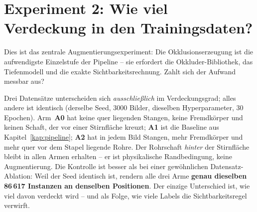 \section{Experiment 2: Wie viel Verdeckung in den Trainingsdaten?}
\label{sec:ablation}

Dies ist das zentrale Augmentierungsexperiment: Die Okklusionserzeugung ist die
aufwendigste Einzelstufe der Pipeline -- sie erfordert die Okkluder-Bibliothek,
das Tiefenmodell und die exakte Sichtbarkeitsrechnung. Zahlt sich der Aufwand
messbar aus?

 Drei Datensätze unterscheiden sich \emph{ausschließlich}
im Verdeckungsgrad; alles andere ist identisch (derselbe Seed, 3000 Bilder,
dieselben Hyperparameter, 30 Epochen). Arm~\textbf{A0} hat keine quer liegenden
Stangen, keine Fremdkörper und keinen Schaft, der vor einer Stirnfläche kreuzt;
\textbf{A1} ist die Baseline aus Kapitel~\ref{kap:pipeline}; \textbf{A2} hat in
jedem Bild Stangen, mehr Fremdkörper und mehr quer vor dem Stapel liegende Rohre.
Der Rohrschaft \emph{hinter} der Stirnfläche bleibt in allen Armen erhalten -- er
ist physikalische Randbedingung, keine Augmentierung. Die Kontrolle ist besser als
bei einer gewöhnlichen Datensatz-Ablation: Weil der Seed identisch ist, rendern
alle drei Arme \textbf{genau dieselben 86\,617 Instanzen an denselben
Positionen}. Der einzige Unterschied ist, wie viel davon verdeckt wird -- und als
Folge, wie viele Labels die Sichtbarkeitsregel verwirft.

\begin{table}[htbp]
\centering
\caption[Okklusionsablation]{Okklusionsablation: erzeugte Datensätze (links) und
Ergebnis bei nativem Maßstab (rechts). Alle sechs Metrikspalten sind über die
drei Arme \textbf{monoton}.}
\label{tab:ablation}
\footnotesize
{}
\end{table}

